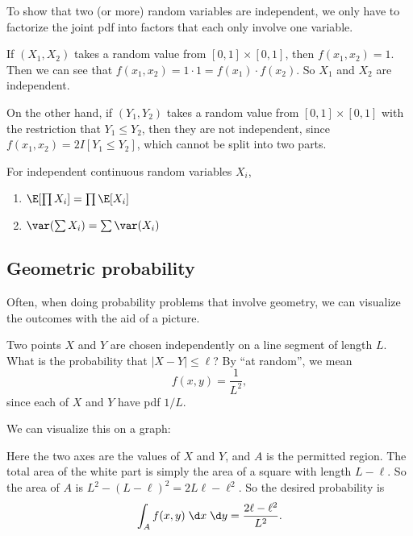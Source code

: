 \documentclass[a4paper]{article}
\begin{document}
To show that two (or more) random variables are independent, we only have to factorize the joint pdf into factors that each only involve one variable.
\begin{eg}
  If $(X_1, X_2)$ takes a random value from $[0, 1] \times [0, 1]$, then $f(x_1, x_2) = 1$. Then we can see that $f(x_1, x_2) = 1\cdot 1 = f(x_1)\cdot f(x_2)$. So $X_1$ and $X_2$ are independent.

  On the other hand, if $(Y_1, Y_2)$ takes a random value from $[0, 1] \times [0, 1]$ with the restriction that $Y_1 \leq Y_2$, then they are not independent, since $f(x_1, x_2) = 2 I[Y_1 \leq Y_2]$, which cannot be split into two parts.
\end{eg}

\begin{prop}
  For independent continuous random variables $X_i$,
  \begin{enumerate}
    \item $\E [\prod X_i] = \prod \E [X_i]$
    \item $\var (\sum X_i) = \sum \var (X_i)$
  \end{enumerate}
\end{prop}

\subsection{Geometric probability}
Often, when doing probability problems that involve geometry, we can visualize the outcomes with the aid of a picture.

\begin{eg}
  Two points $X$ and $Y$ are chosen independently on a line segment of length $L$. What is the probability that $|X - Y| \leq \ell$? By ``at random'', we mean
  \[
    f(x, y) = \frac{1}{L^2},
  \]
  since each of $X$ and $Y$ have pdf $1/L$.

  We can visualize this on a graph:
  \begin{center}
  \end{center}
  Here the two axes are the values of $X$ and $Y$, and $A$ is the permitted region. The total area of the white part is simply the area of a square with length $L - \ell$. So the area of $A$ is $L^2 - (L - \ell)^2 = 2L\ell - \ell^2$. So the desired probability is
  \[
    \int_A f(x, y)\;\d x\;\d y = \frac{2\ell - \ell^2}{L^2}.
  \]
\end{eg}
\end{document}
